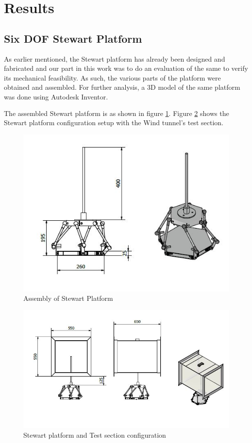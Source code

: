 \section{Results}
\subsection{Six DOF Stewart Platform}
As earlier mentioned, the Stewart platform has already been designed and fabricated and our part in this work was to do an evaluation of the same to verify its mechanical feasibility. As such, the various parts of the platform were obtained and assembled. For further analysis, a 3D model of the same platform was done using Autodesk Inventor.

The assembled Stewart platform is as shown in figure \ref{fig}. Figure \ref{fig1} shows the Stewart platform configuration setup with the Wind tunnel's test section.
\begin{center}
	\begin{figure}[H]
	\centering
	\includegraphics[width=0.8\linewidth]{Figures/Assembly}
	\caption[Assembled Platform]{Assembly of Stewart Platform}
	\label{fig}
	\end{figure}
\end{center}
\begin{center}
	\begin{figure}[H]
	\centering
	\includegraphics[width=0.8\linewidth]{Figures/Test-section}
	\caption[Model placement in Test Section]{Stewart platform and Test section configuration}
	\label{fig1}
	\end{figure}
\end{center}
